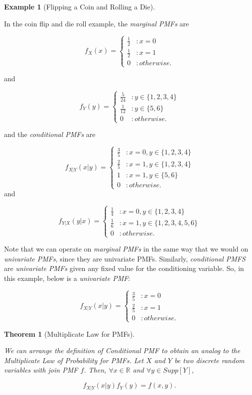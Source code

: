 \documentclass[
]{article}
\newtheorem{theorem}{Theorem}[section]
\theoremstyle{definition}
\theoremstyle{definition}
\newtheorem{example}{Example}[section]
\theoremstyle{definition}
\theoremstyle{remark}
\begin{document}
\begin{example}[Flipping a Coin and Rolling a Die]
\protect\hypertarget{exm:unlabeled-div-45}{}\label{exm:unlabeled-div-45}

In the coin flip and die roll example, the \emph{marginal PMFs} are

\[f_X(x) = \begin{cases} \frac{1}{2} &: x = 0 \\ \frac{1}{2} &: x = 1 \\ 0 &: otherwise. \end{cases}\]

and

\[f_Y(y) = \begin{cases} \frac{5}{24} &: y \in \{1,2,3,4\} \\ \frac{1}{12} &: y \in \{5,6\} \\ 0 &: otherwise. \end{cases}\]

and the \emph{conditional PMFs} are

\[f_{X|Y}(x|y) = \begin{cases} \frac{3}{5} &: x = 0, y \in \{1,2,3,4\} \\ \frac{2}{5} &: x = 1, y \in \{1,2,3,4\} \\ 1 &: x = 1, y \in \{5,6\} \\ 0 &: otherwise. \end{cases}\]
and

\[f_{Y|X}(y|x) = \begin{cases} \frac{1}{4} &: x = 0, y \in \{1,2,3,4\} \\ \frac{1}{6} &: x = 1, y \in \{1,2,3,4,5,6\} \\ 0 &: otherwise. \end{cases}\]

Note that we can operate on \emph{marginal PMFs} in the same way that we would on \emph{univariate PMFs}, since they are univariate PMFs. Similarly, \emph{conditional PMFS} are \emph{univariate PMFs} given any fixed value for the conditioning variable. So, in this example, below is a \emph{univariate PMF}:

\[f_{X|Y}(x|y) = \begin{cases} \frac{3}{5} &: x = 0 \\ \frac{2}{5} &: x = 1 \\ 0 &: otherwise. \end{cases}\]

\end{example}

\begin{theorem}[Multiplicate Law for PMFs]
\protect\hypertarget{thm:unlabeled-div-46}{}\label{thm:unlabeled-div-46}

We can arrange the definition of \emph{Conditional PMF} to obtain an analog to the \emph{Multiplicate Law of Probability} for PMFs. Let \(X\) and \(Y\) be two discrete random variables with join PMF \(f\). Then, \(\forall x \in \mathbb{R}\) and \(\forall y \in Supp[Y]\),

\[f_{X|Y}(x|y)f_Y(y) = f(x,y).\]

\end{theorem}
\end{document}
